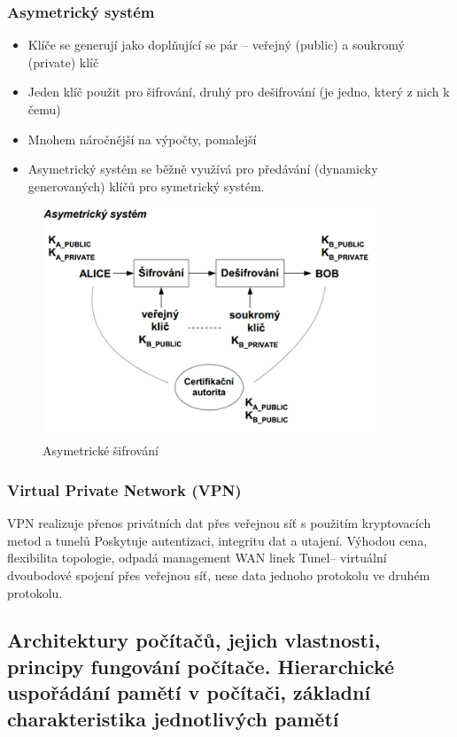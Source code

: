 \documentclass[10pt,a4paper]{article}
\begin{document}
\subsubsection{Asymetrický systém}

\begin{itemize}
\item Klíče se generují jako doplňující se pár – veřejný (public) a soukromý (private) klíč
\item Jeden klíč použit pro šifrování, druhý pro dešifrování (je jedno, který z nich k čemu)
\item Mnohem náročnější na výpočty, pomalejší
\item Asymetrický systém se běžně využívá pro předávání (dynamicky generovaných) klíčů pro symetrický systém.
\end{itemize}
\begin{figure}[ht]
    \centering
    \includegraphics[width=10cm]{asym-sifr.png}
    \caption{Asymetrické šifrování}
    \label{fig:asymSifr}
\end{figure}
\subsubsection{Virtual Private Network (VPN)}
VPN realizuje přenos privátních dat přes veřejnou síť s použitím kryptovacích metod a tunelů Poskytuje autentizaci, integritu dat a utajení. Výhodou cena, flexibilita topologie, odpadá management WAN linek Tunel– virtuální dvoubodové spojení přes veřejnou síť, nese data jednoho protokolu ve druhém protokolu.

\subsection{Architektury počítačů, jejich vlastnosti, principy fungování počítače. Hierarchické uspořádání pamětí v počítači, základní charakteristika jednotlivých pamětí}
\end{document}
